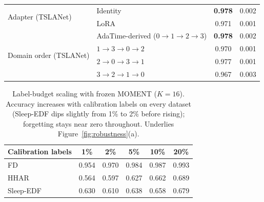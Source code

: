 \begin{table}[t]
\begin{tabular}{ll cc}
\cmidrule(lr){1-4}
\multirow{2}{*}{Adapter (TSLANet)}
 & Identity & \textbf{0.978} & 0.002\\
 & LoRA     & 0.971 & 0.001\\
\cmidrule(lr){1-4}
\multirow{4}{*}{Domain order (TSLANet)}
 & AdaTime-derived ($0{\to}1{\to}2{\to}3$) & \textbf{0.978} & 0.002\\
 & $1{\to}3{\to}0{\to}2$ & 0.970 & 0.001\\
 & $2{\to}0{\to}3{\to}1$ & 0.977 & 0.001\\
 & $3{\to}2{\to}1{\to}0$ & 0.967 & 0.003\\
\bottomrule
\end{tabular}
\end{table}

\begin{table}[t]
\centering
\caption{Label-budget scaling with frozen MOMENT ($K{=}16$). Accuracy
increases with calibration labels on every dataset (Sleep-EDF dips slightly
from 1\% to 2\% before rising); forgetting stays near zero throughout.
Underlies Figure~\ref{fig:robustness}(a).}
\label{tab:budget-moment}
\small
\begin{tabular}{l ccccc}
\toprule
Calibration labels & 1\% & 2\% & 5\% & 10\% & 20\%\\
\midrule
FD & 0.954 & 0.970 & 0.984 & 0.987 & 0.993\\
HHAR & 0.564 & 0.597 & 0.627 & 0.662 & 0.689\\
Sleep-EDF & 0.630 & 0.610 & 0.638 & 0.658 & 0.679\\
\bottomrule
\end{tabular}
\end{table}
